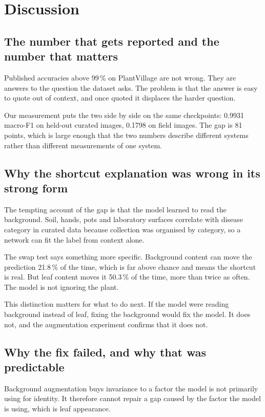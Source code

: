 
\chapter{Discussion}
\label{ch:discussion}

\section{The number that gets reported and the number that matters}

Published accuracies above 99\,\% on PlantVillage are not wrong. They are answers to
the question the dataset asks. The problem is that the answer is easy to quote out of
context, and once quoted it displaces the harder question.

Our measurement puts the two side by side on the same checkpoints: 0.9931 macro-F1 on
held-out curated images, 0.1798 on field images. The gap is 81 points, which is
large enough that the two numbers describe different systems rather than different
measurements of one system.

\section{Why the shortcut explanation was wrong in its strong form}

The tempting account of the gap is that the model learned to read the background.
Soil, hands, pots and laboratory surfaces correlate with disease category in curated
data because collection was organised by category, so a network can fit the label
from context alone.

The swap test says something more specific. Background content can move the
prediction 21.8\,\% of the time, which is far above chance and means the shortcut is
real. But leaf content moves it 50.3\,\% of the time, more than twice as often. The
model is not ignoring the plant.

This distinction matters for what to do next. If the model were reading background
instead of leaf, fixing the background would fix the model. It does not, and the
augmentation experiment confirms that it does not.

\section{Why the fix failed, and why that was predictable}

Background augmentation buys invariance to a factor the model is not primarily using
for identity. It therefore cannot repair a gap caused by the factor the model is
using, which is leaf appearance.

